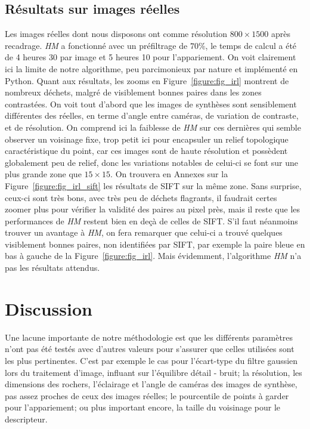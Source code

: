\documentclass[
	a4paper, %
	10pt, %
	unnumberedsections, %
	twoside, %
]{LTJournalArticle}
\begin{document}
\subsection{Résultats sur images réelles}
Les images réelles dont nous disposons ont comme résolution $800 \times 1500$ après recadrage. \textit{HM} a fonctionné
avec un préfiltrage de $70 \%$, le temps de calcul a été de 4 heures 30 par image et 5 heures 10 pour l'appariement.
On voit clairement ici la limite de notre algorithme, peu parcimonieux par nature et implémenté en Python.
Quant aux résultats, les zooms en Figure~\ref{figure:fig_irl} montrent de nombreux déchets, malgré de visiblement
bonnes paires dans les zones contrastées.
On voit tout d'abord que les images de synthèses sont sensiblement différentes des réelles,
en terme d'angle entre caméras, de variation de contraste, et de résolution.
On comprend ici la faiblesse de \textit{HM} sur ces dernières qui semble observer un voisinage fixe,
trop petit ici pour encapsuler un relief topologique caractéristique du point,
car ces images sont de haute résolution et possèdent globalement peu de relief, donc les
variations notables de celui-ci se font sur une plus grande zone que $15 \times 15$.
On trouvera en Annexes sur la Figure~\ref{figure:fig_irl_sift} les résultats de SIFT sur la même zone.
Sans surprise, ceux-ci sont très bons, avec très peu de déchets flagrants, il faudrait certes zoomer plus
pour vérifier la validité des paires au pixel près, mais il reste que les performances de \textit{HM}
restent bien en deçà de celles de SIFT. S'il faut néanmoins trouver un avantage à \textit{HM}, on fera
remarquer que celui-ci a trouvé quelques visiblement bonnes paires, non identifiées par SIFT, par
exemple la paire bleue en bas à gauche de la Figure~\ref{figure:fig_irl}.
Mais évidemment, l'algorithme \textit{HM} n'a pas les résultats attendus.


\clearpage

\section{Discussion}

Une lacune importante de notre méthodologie est que les différents paramètres
n'ont pas été testés avec d'autres valeurs pour s'assurer que celles
utilisées sont les plus pertinentes.
C'est par exemple le cas pour l'écart-type du filtre gaussien
lors du traitement d'image, influant sur l'équilibre détail - bruit;
la résolution, les dimensions des rochers, l'éclairage et l'angle de caméras des images de synthèse,
pas assez proches de ceux des images réelles;
le pourcentile de points à garder pour l'appariement;
ou plus important encore, la taille du voisinage pour le descripteur.\\
\end{document}
